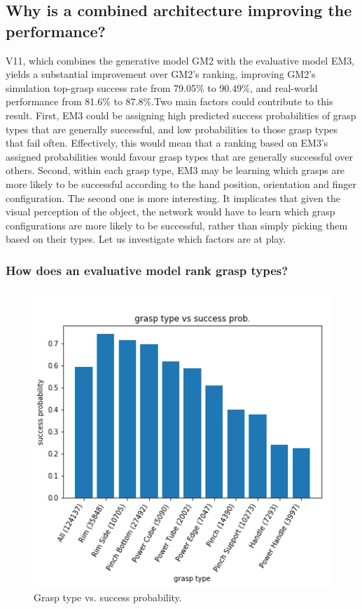 \subsection{Why is a combined architecture improving the performance?}
\noindent

V11, which combines the generative model GM2 with the evaluative model EM3, yields a substantial improvement over GM2's ranking, improving GM2's simulation top-grasp success rate from 79.05\% to 90.49\%, and real-world performance from 81.6\% to 87.8\%.Two main factors could contribute to this result. First, EM3 could be assigning high predicted success probabilities of grasp types that are generally successful, and low probabilities to those grasp types that fail often. Effectively, this would mean that a ranking based on EM3's assigned probabilities would favour grasp types that are generally successful over others. Second, within each grasp type, EM3 may be learning which grasps are more likely to be successful according to the hand position, orientation and finger configuration. The second one is more interesting. It implicates that given the visual perception of the object, the network would have to learn which grasp configurations are more likely to be successful, rather than simply picking them based on their types. Let us investigate which factors are at play.

\subsubsection{How does an evaluative model rank grasp types?}
\noindent


\begin{figure}
\centering 
\includegraphics[width=0.6\columnwidth]{images/post-analysis/[2] Grasp_type_vs_success_prob.png}
\caption{Grasp type vs. success probability.}
\label{fig:post2}
\end{figure}


